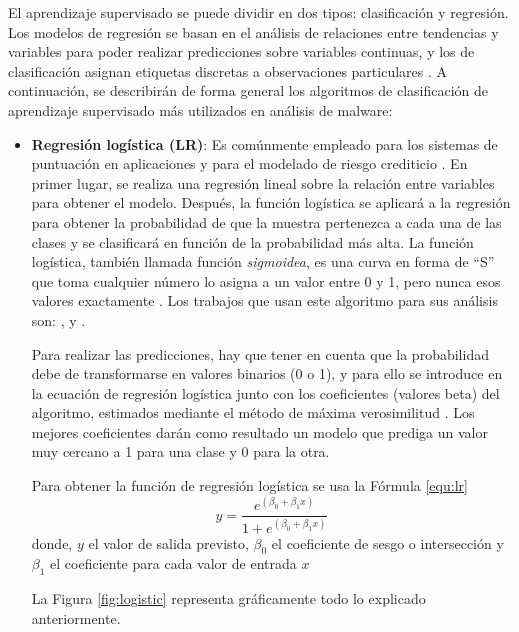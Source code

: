 El aprendizaje supervisado se puede dividir en dos tipos: clasificación y regresión. Los modelos de regresión se basan en el análisis de relaciones entre tendencias y variables para poder realizar predicciones sobre variables continuas, y los de clasificación asignan etiquetas discretas a observaciones particulares \cite{127}. A continuación, se describirán de forma general los algoritmos de clasificación de aprendizaje supervisado más utilizados en análisis de malware:


\begin{itemize}
\item \textbf{Regresión logística (\gls{LR})}: Es comúnmente empleado para los sistemas de puntuación en aplicaciones y para el modelado de riesgo crediticio \cite{131}. En primer lugar, se realiza una regresión lineal sobre la relación entre variables para obtener el modelo. Después, la función logística se aplicará a la regresión para obtener la probabilidad de que la muestra pertenezca a cada una de las clases y se clasificará en función de la probabilidad más alta. La función logística, también llamada función \textit{sigmoidea}, es una curva en forma de ``S'' que toma cualquier número lo asigna a un valor entre 0 y 1, pero nunca esos valores exactamente \cite{132}. Los trabajos que usan este algoritmo para sus análisis son: \cite{elderan}, \cite{rwguard} y \cite{entropy}.

Para realizar las predicciones, hay que tener en cuenta que la probabilidad debe de transformarse en valores binarios (0 o 1), y para ello se introduce en la ecuación de regresión logística junto con los coeficientes (valores beta) del algoritmo, estimados mediante el método de máxima verosimilitud \cite{133}. Los mejores coeficientes darán como resultado un modelo que prediga un valor muy cercano a 1 para una clase y 0 para la otra.

Para obtener la función de regresión logística se usa la Fórmula \ref{equ:lr} \cite{132}
\begin{equation}\label{equ:lr}
y = \frac{e^{(\beta_0 + \beta_1x)}}{1 + e^{(\beta_0 + \beta_1x)}}
\end{equation}
\noindent donde, $y$ el valor de salida previsto, $\beta_0$ el coeficiente de sesgo o intersección y $\beta_1$ el coeficiente para cada valor de entrada $x$


La Figura \ref{fig:logistic} representa gráficamente todo lo explicado anteriormente. 


\end{itemize}
